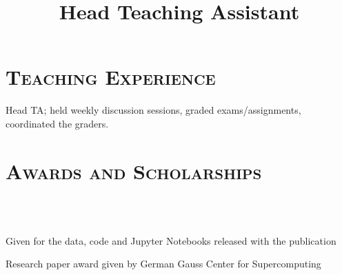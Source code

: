\begin{resume}

	\section{\textsc{Teaching Experience}}

	\title{Head Teaching Assistant}
	\begin{position}
		Head TA; held weekly discussion sessions, graded exams/assignments, coordinated the
    graders.
	\end{position}


	\section{\textsc{Awards and Scholarships}}

	\begin{formatb}
		\\
		\body\\
	\end{formatb}

  \begin{position}
    Given for the data, code and Jupyter Notebooks released with the publication
  \end{position}

  \begin{position}
    Research paper award given by German Gauss Center for Supercomputing
  \end{position}



\end{resume}

